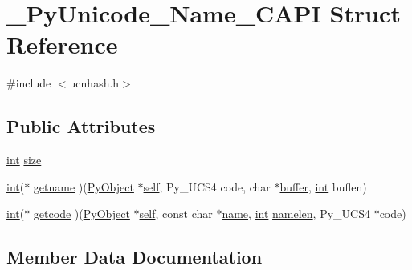 \hypertarget{struct___py_unicode___name___c_a_p_i}{}\section{\+\_\+\+Py\+Unicode\+\_\+\+Name\+\_\+\+C\+A\+PI Struct Reference}
\label{struct___py_unicode___name___c_a_p_i}


{\ttfamily \#include $<$ucnhash.\+h$>$}

\subsection*{Public Attributes}
\begin{DoxyCompactItemize}
\item 
\mbox{\hyperlink{warnings_8h_a74f207b5aa4ba51c3a2ad59b219a423b}{int}} \mbox{\hyperlink{struct___py_unicode___name___c_a_p_i_a9faa2e068f88013c2c25a94a7df9c391}{size}}
\item 
\mbox{\hyperlink{warnings_8h_a74f207b5aa4ba51c3a2ad59b219a423b}{int}}($\ast$ \mbox{\hyperlink{struct___py_unicode___name___c_a_p_i_a78b09e5d34c24880c4e24ca6cb51dda9}{getname}} )(\mbox{\hyperlink{_python27_2object_8h_aadc84ac7aed2cfa6f20c25f62bf3dac7}{Py\+Object}} $\ast$\mbox{\hyperlink{modsupport_8h_a0180ca1808366e5da641475e8bf8cca3}{self}}, Py\+\_\+\+U\+C\+S4 code, char $\ast$\mbox{\hyperlink{classbuffer}{buffer}}, \mbox{\hyperlink{warnings_8h_a74f207b5aa4ba51c3a2ad59b219a423b}{int}} buflen)
\item 
\mbox{\hyperlink{warnings_8h_a74f207b5aa4ba51c3a2ad59b219a423b}{int}}($\ast$ \mbox{\hyperlink{struct___py_unicode___name___c_a_p_i_ad4efd77b965fd09f2ae3325fb1784a02}{getcode}} )(\mbox{\hyperlink{_python27_2object_8h_aadc84ac7aed2cfa6f20c25f62bf3dac7}{Py\+Object}} $\ast$\mbox{\hyperlink{modsupport_8h_a0180ca1808366e5da641475e8bf8cca3}{self}}, const char $\ast$\mbox{\hyperlink{structname}{name}}, \mbox{\hyperlink{warnings_8h_a74f207b5aa4ba51c3a2ad59b219a423b}{int}} \mbox{\hyperlink{_s_d_l__opengl__glext_8h_a530c192f48a964d8ff63cc011b1459bb}{namelen}}, Py\+\_\+\+U\+C\+S4 $\ast$code)
\end{DoxyCompactItemize}


\subsection{Member Data Documentation}
\mbox{\label{struct___py_unicode___name___c_a_p_i_ad4efd77b965fd09f2ae3325fb1784a02}} 
